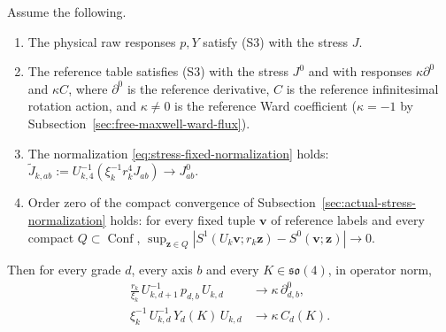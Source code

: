 \begin{proposition}
\label{prop:ward-readout-limits}
Assume the following.
\begin{enumerate}
\item[(a)] The physical raw responses $p,Y$ satisfy (S3) with the stress
  $J$.
\item[(b)] The reference table satisfies (S3) with the stress $J^0$ and
  with responses $\kappa\partial^0$ and $\kappa C$, where $\partial^0$ is the
  reference derivative, $C$ is the reference infinitesimal rotation action,
  and $\kappa\ne0$ is the reference Ward coefficient
  ($\kappa=-1$ by Subsection~\ref{sec:free-maxwell-ward-flux}).
\item[(c)] The normalization \eqref{eq:stress-fixed-normalization} holds:
  $\widetilde J_{k,ab}:=U_{k,4}^{-1}(\xi_k^{-1}r_k^4J_{ab})\to J^0_{ab}$.
\item[(d)] Order zero of the compact convergence of
  Subsection~\ref{sec:actual-stress-normalization} holds: for every fixed
  tuple $\boldsymbol v$ of reference labels and every compact
  $Q\subset\operatorname{Conf}$,
  $\sup_{\boldsymbol z\in Q}
   |S^1(U_k\boldsymbol v;r_k\boldsymbol z)-S^0(\boldsymbol v;\boldsymbol z)|
   \to0$.
\end{enumerate}
Then for every grade $d$, every axis $b$ and every $K\in\mathfrak{so}(4)$,
in operator norm,
\begin{align}
 \frac{r_k}{\xi_k}\,U_{k,d+1}^{-1}\,p_{d,b}\,U_{k,d}
   &\longrightarrow\kappa\,\partial^0_{d,b},
 \label{eq:ward-translation-readout}\\
 \xi_k^{-1}\,U_{k,d}^{-1}\,Y_d(K)\,U_{k,d}
   &\longrightarrow\kappa\,C_d(K).
 \label{eq:ward-rotation-readout}
\end{align}
\end{proposition}

